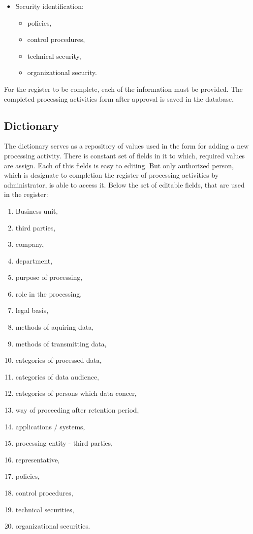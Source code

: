 \documentclass[en, noamssymb]{mgr}
\begin{document}
\begin{itemize}
\begin{itemize}
\end{itemize}

\item Security identification:

\begin{itemize}

\item policies,
\item control procedures,
\item technical security,
\item organizational security.

\end{itemize}

\end{itemize}

For the register to be complete, each of the information must be provided. The completed processing activities form after approval is saved in the database.

\subsection{Dictionary}

The dictionary serves as a repository of values used in the form for adding a new processing activity. There is constant set of fields in it to which, required values are assign. Each of this fields is easy to editing. But only authorized person, which is designate to completion the register of processing activities by administrator, is able to access it. Below the set of editable fields, that are used in the register: 

\begin{enumerate}

\item Business unit,
\item third parties,
\item company,
\item department,
\item purpose of processing,
\item role in the processing,
\item legal basis,
\item methods of aquiring data,
\item methods of transmitting data,
\item categories of processed data,
\item categories of data audience,
\item categories of persons which data concer,
\item way of proceeding after retention period,
\item applications / systems,
\item processing entity - third parties,
\item representative,
\item policies,
\item control procedures,
\item technical securities,
\item organizational securities.


\end{enumerate}
\end{document}
